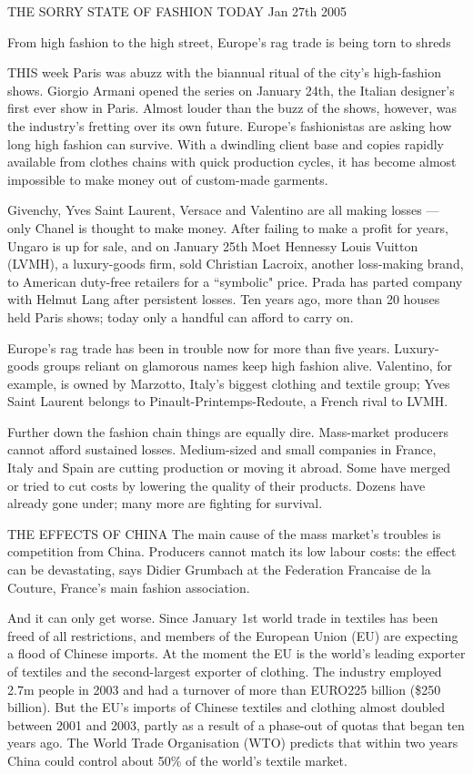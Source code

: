 \documentclass[letterpaper,12pt]{article}
\begin{document}

\pagebreak THE SORRY STATE OF FASHION TODAY Jan 27th 2005

From high fashion to the high street, Europe's rag trade is being
torn to shreds

THIS week Paris was abuzz with the biannual ritual of the city's
high-fashion shows. Giorgio Armani opened the series on January
24th, the Italian designer's first ever show in Paris. Almost
louder than the buzz of the shows, however, was the industry's
fretting over its own future. Europe's fashionistas are asking how
long high fashion can survive. With a dwindling client base and
copies rapidly available from clothes chains with quick production
cycles, it has become almost impossible to make money out of
custom-made garments.

Givenchy, Yves Saint Laurent, Versace and Valentino are all making
losses --- only Chanel is thought to make money. After failing to
make a profit for years, Ungaro is up for sale, and on January
25th Moet Hennessy Louis Vuitton (LVMH), a luxury-goods firm, sold
Christian Lacroix, another loss-making brand, to American
duty-free retailers for a ``symbolic" price. Prada has parted
company with Helmut Lang after persistent losses. Ten years ago,
more than 20 houses held Paris shows; today only a handful can
afford to carry on.

Europe's rag trade has been in trouble now for more than five
years. Luxury-goods groups reliant on glamorous names keep high
fashion alive. Valentino, for example, is owned by Marzotto,
Italy's biggest clothing and textile group; Yves Saint Laurent
belongs to Pinault-Printemps-Redoute, a French rival to LVMH.

Further down the fashion chain things are equally dire.
Mass-market producers cannot afford sustained losses. Medium-sized
and small companies in France, Italy and Spain are cutting
production or moving it abroad. Some have merged or tried to cut
costs by lowering the quality of their products. Dozens have
already gone under; many more are fighting for survival.

THE EFFECTS OF CHINA The main cause of the mass market's troubles
is competition from China. Producers cannot match its low labour
costs: the effect can be devastating, says Didier Grumbach at the
Federation Francaise de la Couture, France's main fashion
association.

And it can only get worse. Since January 1st world trade in
textiles has been freed of all restrictions, and members of the
European Union (EU) are expecting a flood of Chinese imports. At
the moment the EU is the world's leading exporter of textiles and
the second-largest exporter of clothing. The industry employed
2.7m people in 2003 and had a turnover of more than EURO225
billion (\$250 billion). But the EU's imports of Chinese textiles
and clothing almost doubled between 2001 and 2003, partly as a
result of a phase-out of quotas that began ten years ago. The
World Trade Organisation (WTO) predicts that within two years
China could control about 50\% of the world's textile market.
\end{document}
